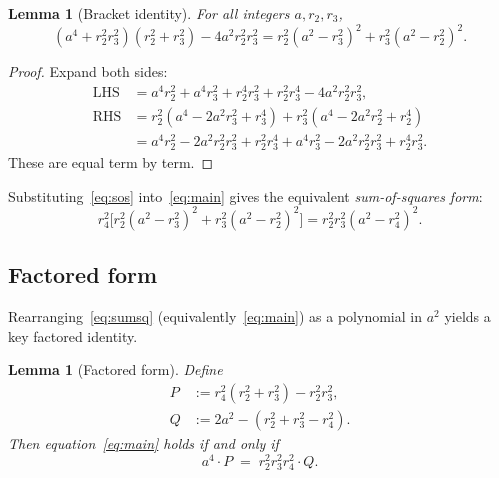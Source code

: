 \documentclass[12pt, a4paper]{article}
\newtheorem{lemma}[theorem]{Lemma}
\theoremstyle{definition}
\begin{document}
\begin{lemma}[Bracket identity]\label{lem:sos}
  For all integers $a, r_2, r_3$,
  \begin{equation}\label{eq:sos}
    (a^4 + r_2^2 r_3^2)(r_2^2+r_3^2) - 4a^2 r_2^2 r_3^2
    = r_2^2(a^2-r_3^2)^2 + r_3^2(a^2-r_2^2)^2.
  \end{equation}
\end{lemma}

\begin{proof}
  Expand both sides:
  \begin{align*}
    \mathrm{LHS} &= a^4 r_2^2 + a^4 r_3^2 + r_2^4 r_3^2 + r_2^2 r_3^4
      - 4a^2 r_2^2 r_3^2,\\
    \mathrm{RHS} &= r_2^2(a^4 - 2a^2 r_3^2 + r_3^4)
                 + r_3^2(a^4 - 2a^2 r_2^2 + r_2^4)\\
                &= a^4 r_2^2 - 2a^2 r_2^2 r_3^2 + r_2^2 r_3^4
                 + a^4 r_3^2 - 2a^2 r_2^2 r_3^2 + r_2^4 r_3^2.
  \end{align*}
  These are equal term by term.
\end{proof}

\noindent Substituting~\eqref{eq:sos} into~\eqref{eq:main} gives the
equivalent \emph{sum-of-squares form}:
\begin{equation}\label{eq:sumsq}
  r_4^2\bigl[r_2^2(a^2-r_3^2)^2 + r_3^2(a^2-r_2^2)^2\bigr]
  = r_2^2 r_3^2(a^2-r_4^2)^2.
\end{equation}

\subsection{Factored form}

Rearranging~\eqref{eq:sumsq} (equivalently~\eqref{eq:main}) as a polynomial in
$a^2$ yields a key factored identity.

\begin{lemma}[Factored form]\label{lem:factor}
  Define
  \begin{align}
    P &:= r_4^2(r_2^2+r_3^2) - r_2^2 r_3^2, \label{eq:P}\\
    Q &:= 2a^2 - (r_2^2 + r_3^2 - r_4^2). \label{eq:Q}
  \end{align}
  Then equation~\eqref{eq:main} holds if and only if
  \begin{equation}\label{eq:factored}
    a^4 \cdot P \;=\; r_2^2 r_3^2 r_4^2 \cdot Q.
  \end{equation}
\end{lemma}
\end{document}
